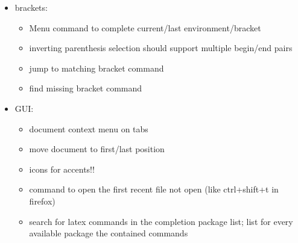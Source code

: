 \documentclass[10pt,a4paper,landscape]{report}
\begin{document}
\begin{itemize}
\begin{itemize}
	\item cut buffer for environment content (multiline to content, singleline to option ?)
	\item Word completion over all open documents
	\item Show definition of \verb+\newcommand+ commands in the completion list as hint
	\item \verb+\begin{Umgebungsname}+ should not add \verb+\end{Umgebungsname}+ if that \textbackslash end is already in the next/a later line
	 	\item Open completion list of xyz if cursor is after \verb+\xyz{+ (= ignore \verb+{}+ before cursor)
		\item treat \verb+\+abc\{\%<xyz\%>\} and \verb+\+abc\{\%<def\%>\} as identical and ignore one of them (in the list of possible completions)
		\item Understand \verb+newcounter, tex: \newcount \newfont \def, \edef, \xdef, \gdef+
		\item Detect completion within tikz/pstricks/... environments and show a list of corresponding tikz/... commands
		\item text completion should show parameters of commands (e.g. reference names) even if they aren't currently used
		\item merging text completion and spell checker cache?
	\end{itemize}
	\item brackets: \begin{itemize}
		\item Menu command to complete current/last environment/bracket
		\item inverting parenthesis selection should support multiple begin/end pairs
		\item jump to matching bracket command
		\item find missing bracket command
	\end{itemize}  
	\item GUI: \begin{itemize}
	\item document context menu on tabs
	\item move document to first/last position 
	\item icons for accents!!
		\item command to open the first recent file not open (like ctrl+shift+t in firefox)
		\item search for latex commands in the completion package list; list for every available package the contained commands

\end{itemize}
\end{itemize}
\end{document}
